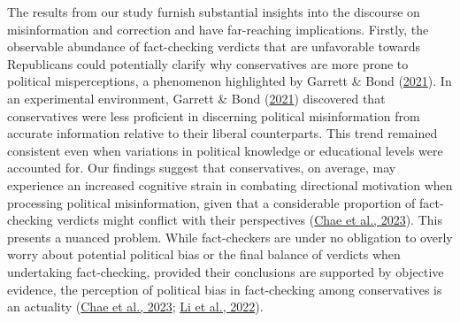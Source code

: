 \documentclass[
  12pt,
]{article}
\begin{document}
The results from our study furnish substantial insights into the
discourse on misinformation and correction and have far-reaching
implications. Firstly, the observable abundance of fact-checking
verdicts that are unfavorable towards Republicans could potentially
clarify why conservatives are more prone to political misperceptions, a
phenomenon highlighted by Garrett \& Bond
(\protect\hyperlink{ref-garrett2021conservatives}{2021}). In an
experimental environment, Garrett \& Bond
(\protect\hyperlink{ref-garrett2021conservatives}{2021}) discovered that
conservatives were less proficient in discerning political
misinformation from accurate information relative to their liberal
counterparts. This trend remained consistent even when variations in
political knowledge or educational levels were accounted for. Our
findings suggest that conservatives, on average, may experience an
increased cognitive strain in combating directional motivation when
processing political misinformation, given that a considerable
proportion of fact-checking verdicts might conflict with their
perspectives (\protect\hyperlink{ref-chae2023perceiving}{Chae et al.,
2023}). This presents a nuanced problem. While fact-checkers are under
no obligation to overly worry about potential political bias or the
final balance of verdicts when undertaking fact-checking, provided their
conclusions are supported by objective evidence, the perception of
political bias in fact-checking among conservatives is an actuality
(\protect\hyperlink{ref-chae2023perceiving}{Chae et al., 2023};
\protect\hyperlink{ref-li2022power}{Li et al., 2022}).
\end{document}
